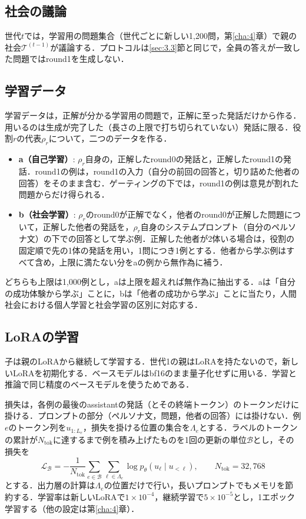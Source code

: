 \subsection{社会の議論}
\label{sec:3.5.1}

世代$t$では，学習用の問題集合（世代ごとに新しい1,200問，第\ref{cha:4}章）で親の社会$\mathcal{T}^{(t-1)}$が議論する．プロトコルは\ref{sec:3.3}節と同じで，全員の答えが一致した問題ではround1を生成しない．

\subsection{学習データ}
\label{sec:3.5.2}

学習データは，正解が分かる学習用の問題で，正解に至った発話だけから作る．用いるのは生成が完了した（長さの上限で打ち切られていない）発話に限る．役割$r$の代表$\rho_r$について，二つのデータを作る．

\begin{itemize}
\item \textbf{a（自己学習）}: $\rho_r$自身の，正解したround0の発話と，正解したround1の発話．round1の例は，round1の入力（自分の前回の回答と，切り詰めた他者の回答）をそのまま含む．ゲーティングの下では，round1の例は意見が割れた問題からだけ得られる．
\item \textbf{b（社会学習）}: $\rho_r$のround0が正解でなく，他者のround0が正解した問題について，正解した他者の発話を，$\rho_r$自身のシステムプロンプト（自分のペルソナ文）の下での回答として学ぶ例．正解した他者が2体いる場合は，役割の固定順で先の1体の発話を用い，1問につき1例とする．他者から学ぶ例はすべて含め，上限に満たない分をaの例から無作為に補う．
\end{itemize}

どちらも上限は1,000例とし，aは上限を超えれば無作為に抽出する．aは「自分の成功体験から学ぶ」ことに，bは「他者の成功から学ぶ」ことに当たり，人間社会における個人学習と社会学習の区別に対応する．

\subsection{LoRAの学習}
\label{sec:3.5.3}

子は親のLoRAから継続して学習する．世代1の親はLoRAを持たないので，新しいLoRAを初期化する．ベースモデルはbf16のまま量子化せずに用いる．学習と推論で同じ精度のベースモデルを使うためである．

損失は，各例の最後のassistantの発話（とその終端トークン）のトークンだけに掛ける．プロンプトの部分（ペルソナ文，問題，他者の回答）には掛けない．例$e$のトークン列を$u_{1:L_e}$，損失を掛ける位置の集合を$\Lambda_e$とする．ラベルのトークンの累計が$N_{\mathrm{tok}}$に達するまで例を積み上げたものを1回の更新の単位$\mathcal{B}$とし，その損失を
\begin{equation}
\mathcal{L}_{\mathcal{B}} = - \frac{1}{N_{\mathrm{tok}}} \sum_{e \in \mathcal{B}} \sum_{\ell \in \Lambda_e} \log p_\theta(u_\ell \mid u_{<\ell}), \qquad N_{\mathrm{tok}} = 32{,}768
\label{eq:loss}
\end{equation}
とする．出力層の計算は$\Lambda_e$の位置だけで行い，長いプロンプトでもメモリを節約する．学習率は新しいLoRAで$1 \times 10^{-4}$，継続学習で$5 \times 10^{-5}$とし，1エポック学習する（他の設定は第\ref{cha:4}章）．

